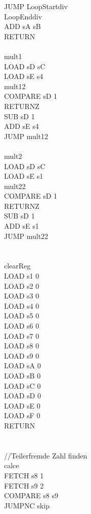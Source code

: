\documentclass{scrartcl}
\begin{document}
\begin{multicols*}{2}
JUMP LoopStartdiv\\
LoopEnddiv\\
ADD sA sB\\
RETURN\\
\\
mult1\\
LOAD sD sC\\
LOAD sE s4\\
mult12\\
COMPARE sD 1\\
RETURNZ\\
SUB sD 1\\
ADD sE s4\\
JUMP mult12\\
\\
mult2\\
LOAD sD sC\\
LOAD sE s1\\
mult22\\
COMPARE sD 1\\
RETURNZ\\
SUB sD 1\\
ADD sE s1\\
JUMP mult22\\
\\
\\
clearReg\\
LOAD s1 0\\
LOAD s2 0\\
LOAD s3 0\\
LOAD s4 0\\
LOAD s5 0\\
LOAD s6 0\\
LOAD s7 0\\
LOAD s8 0\\
LOAD s9 0\\
LOAD sA 0\\
LOAD sB 0\\
LOAD sC 0\\
LOAD sD 0\\
LOAD sE 0\\
LOAD sF 0\\
RETURN\\
\\
\\
//Teilerfremde Zahl finden\\
calce\\
FETCH s8 1\\
FETCH s9 2\\
COMPARE s8 s9\\
JUMPNC skip\\

\end{multicols*}
\end{document}
